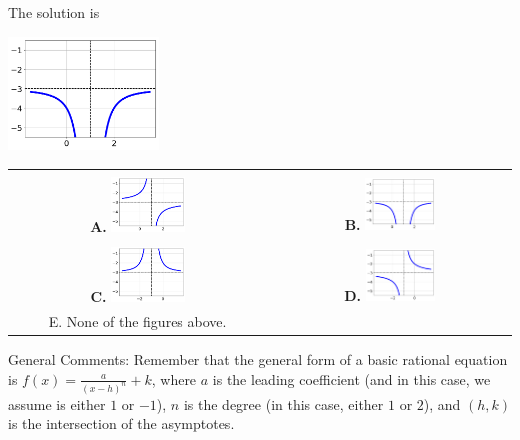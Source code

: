\documentclass{article}[14pt]
\begin{document}
 
 The solution is  
 \begin{center} \includegraphics[width=0.3\textwidth]{../Figures/rationalEquationToGraphAB.png} \end{center}\begin{tabular}{|c|c|} 
\hline 
 & \tabularnewline 
 \textbf{A.} \includegraphics[width=0.3\textwidth]{../Figures/rationalEquationToGraphAA.png} & \textbf{B.} \includegraphics[width=0.3\textwidth]{../Figures/rationalEquationToGraphAB.png} \tabularnewline 
\hline 
 & \tabularnewline 
 \textbf{C.} \includegraphics[width=0.3\textwidth]{../Figures/rationalEquationToGraphAC.png} & \textbf{D.} \includegraphics[width=0.3\textwidth]{../Figures/rationalEquationToGraphAD.png} \tabularnewline 
\hline 
 E. None of the figures above. & \tabularnewline 
\hline 
 \end{tabular} 
 
General Comments: Remember that the general form of a basic rational equation is $ f(x) = \frac{a}{(x-h)^n} + k$, where $a$ is the leading coefficient (and in this case, we assume is either $1$ or $-1$), $n$ is the degree (in this case, either $1$ or $2$), and $(h, k)$ is the intersection of the asymptotes.
\end{document}
